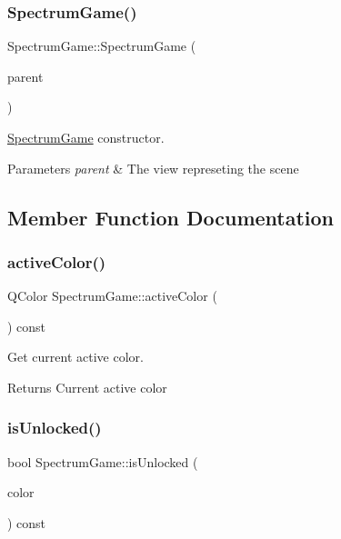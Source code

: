 \subsubsection{\texorpdfstring{Spectrum\+Game()}{SpectrumGame()}}
{\footnotesize\ttfamily Spectrum\+Game\+::\+Spectrum\+Game (\begin{DoxyParamCaption}\item[{Q\+Graphics\+View $\ast$}]{parent }\end{DoxyParamCaption})}



\hyperlink{class_spectrum_game}{Spectrum\+Game} constructor. 


\begin{DoxyParams}{Parameters}
{\em parent} & The view represeting the scene \\
\hline
\end{DoxyParams}


\subsection{Member Function Documentation}
\mbox{\label{class_spectrum_game_a8c40ad9ead765c9d5be4ef716edf6cd4}} 
\subsubsection{\texorpdfstring{active\+Color()}{activeColor()}}
{\footnotesize\ttfamily Q\+Color Spectrum\+Game\+::active\+Color (\begin{DoxyParamCaption}{ }\end{DoxyParamCaption}) const}



Get current active color. 

\begin{DoxyReturn}{Returns}
Current active color 
\end{DoxyReturn}
\mbox{\label{class_spectrum_game_a0b95f601a2eb6a31baf10b6d37e38a2c}} 
\subsubsection{\texorpdfstring{is\+Unlocked()}{isUnlocked()}\hspace{0.1cm}{\footnotesize\ttfamily [1/2]}}
{\footnotesize\ttfamily bool Spectrum\+Game\+::is\+Unlocked (\begin{DoxyParamCaption}\item[{const Q\+Color \&}]{color }\end{DoxyParamCaption}) const}



